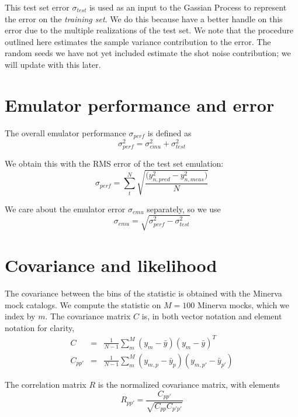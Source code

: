\documentclass[12pt]{article}
\begin{document}
This test set error $\sigma_{test}$ is used as an input to the Gassian Process to represent the error on the \emph{training set}. 
We do this because have a better handle on this error due to the multiple realizations of the test set.
We note that the procedure outlined here estimates the sample variance contribution to the error.
The random seeds we have not yet included estimate the shot noise contribution; we will update with this later.


\section{Emulator performance and error}

The overall emulator performance $\sigma_{perf}$ is defined as
\begin{equation}
    \sigma_{perf}^2 = \sigma_{emu}^2 + \sigma_{test}^2
\end{equation}

We obtain this with the RMS error of the test set emulation:
\begin{equation}
    \sigma_{perf} = \sum_t^N \sqrt{ \frac{\big( y_{n,pred}^2 - y_{n,meas}^2 \big)} {N}}
\end{equation}

We care about the emulator error $\sigma_{emu}$ separately, so we use
\begin{equation}
    \sigma_{emu} = \sqrt{ \sigma_{perf}^2 - \sigma_{test}^2 }
\end{equation}

\section{Covariance and likelihood}

The covariance between the bins of the statistic is obtained with the Minerva mock catalogs. We compute the statistic on $M=100$ Minerva mocks, which we index by $m$. The covariance matrix $C$ is, in both vector notation and element notation for clarity,
\begin{eqnarray}
C &=& \frac{1}{N-1} \sum_m^M (y_{m} - \bar{y})(y_{m} - \bar{y})^T  \\
C_{pp'} &=& \frac{1}{N-1} \sum_m^M (y_{m,p} - \bar{y}_{p})(y_{m,p'} - \bar{y}_{p'}) 
\end{eqnarray}

The correlation matrix $R$ is the normalized covariance matrix, with elements
\begin{equation}
R_{pp'} = \frac{C_{pp'}}{\sqrt{ C_{pp} C_{p'p'}}} 
\end{equation}
\end{document}
